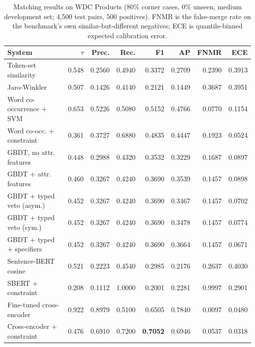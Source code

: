 \begin{table}[t]
\centering
\caption{Matching results on WDC Products (80\% corner cases, 0\% unseen, medium development set; 4{,}500 test pairs, 500 positives). FNMR is the false-merge rate on the benchmark's own similar-but-different negatives; ECE is quantile-binned expected calibration error.}
\label{tab:matching}
\small
\begin{tabular}{lrrrrrrr}
\toprule
System & $\tau$ & Prec. & Rec. & F1 & AP & FNMR & ECE \\
\midrule
Token-set similarity & 0.548 & 0.2560 & 0.4940 & 0.3372 & 0.2709 & 0.2390 & 0.3913 \\
Jaro-Winkler & 0.507 & 0.1426 & 0.4140 & 0.2121 & 0.1449 & 0.3687 & 0.3951 \\
Word co-occurrence + SVM \cite{peeters2024wdc} & 0.653 & 0.5226 & 0.5080 & 0.5152 & 0.4766 & 0.0770 & 0.1154 \\
Word co-occ. + constraint & 0.361 & 0.3727 & 0.6880 & 0.4835 & 0.4447 & 0.1923 & 0.0524 \\
GBDT, no attr. features & 0.448 & 0.2988 & 0.4320 & 0.3532 & 0.3229 & 0.1687 & 0.0897 \\
GBDT + attr. features & 0.460 & 0.3267 & 0.4240 & 0.3690 & 0.3539 & 0.1457 & 0.0898 \\
GBDT + typed veto (asym.) & 0.452 & 0.3267 & 0.4240 & 0.3690 & 0.3467 & 0.1457 & 0.0702 \\
GBDT + typed veto (sym.) & 0.452 & 0.3267 & 0.4240 & 0.3690 & 0.3478 & 0.1457 & 0.0774 \\
GBDT + typed + specifiers & 0.452 & 0.3267 & 0.4240 & 0.3690 & 0.3664 & 0.1457 & 0.0671 \\
Sentence-BERT cosine & 0.521 & 0.2223 & 0.4540 & 0.2985 & 0.2176 & 0.2637 & 0.4030 \\
SBERT + constraint & 0.208 & 0.1112 & 1.0000 & 0.2001 & 0.2281 & 0.9997 & 0.2901 \\
Fine-tuned cross-encoder & 0.922 & 0.8979 & 0.5100 & 0.6505 & 0.7840 & 0.0097 & 0.0480 \\
Cross-encoder + constraint & 0.476 & 0.6910 & 0.7200 & \textbf{0.7052} & 0.6946 & 0.0537 & 0.0318 \\
\bottomrule
\end{tabular}
\end{table}
